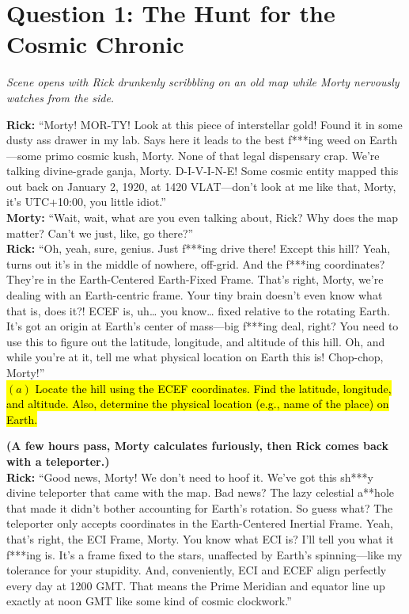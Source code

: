 \documentclass[a4paper, 12pt]{exam}
\begin{document}
	\pagebreak
	
	

	\section*{Question 1: The Hunt for the Cosmic Chronic}

\noindent \textit{Scene opens with Rick drunkenly scribbling on an old map while Morty nervously watches from the side.}

\bigskip
\noindent \textbf{Rick:} “Morty! MOR-TY! Look at this piece of interstellar gold! Found it in some dusty ass drawer in my lab. Says here it leads to the best f***ing weed on Earth—some primo cosmic kush, Morty. None of that legal dispensary crap. We’re talking divine-grade ganja, Morty. D-I-V-I-N-E! Some cosmic entity mapped this out back on January 2, 1920, at 1420 VLAT—don’t look at me like that, Morty, it’s UTC+10:00, you little idiot.” \\

\noindent \textbf{Morty:} “Wait, wait, what are you even talking about, Rick? Why does the map matter? Can’t we just, like, go there?” \\

\noindent \textbf{Rick:} “Oh, yeah, sure, genius. Just f***ing drive there! Except this hill? Yeah, turns out it’s in the middle of nowhere, off-grid. And the f***ing coordinates? They’re in the Earth-Centered Earth-Fixed Frame. That’s right, Morty, we’re dealing with an Earth-centric frame. Your tiny brain doesn’t even know what that is, does it?! ECEF is, uh… you know… fixed relative to the rotating Earth. It’s got an origin at Earth’s center of mass—big f***ing deal, right? You need to use this to figure out the latitude, longitude, and altitude of this hill. Oh, and while you’re at it, tell me what physical location on Earth this is! Chop-chop, Morty!” \\

\hl{$(a)$ Locate the hill using the ECEF coordinates. Find the latitude, longitude, and altitude. Also, determine the physical location (e.g., name of the place) on Earth.}

\bigskip
\noindent \textbf{(A few hours pass, Morty calculates furiously, then Rick comes back with a teleporter.)} \\

\noindent \textbf{Rick:} “Good news, Morty! We don’t need to hoof it. We’ve got this sh***y divine teleporter that came with the map. Bad news? The lazy celestial a**hole that made it didn’t bother accounting for Earth’s rotation. So guess what? The teleporter only accepts coordinates in the Earth-Centered Inertial Frame. Yeah, that’s right, the ECI Frame, Morty. You know what ECI is? I’ll tell you what it f***ing is. It’s a frame fixed to the stars, unaffected by Earth’s spinning—like my tolerance for your stupidity. And, conveniently, ECI and ECEF align perfectly every day at 1200 GMT. That means the Prime Meridian and equator line up exactly at noon GMT like some kind of cosmic clockwork.”\\
\end{document}
